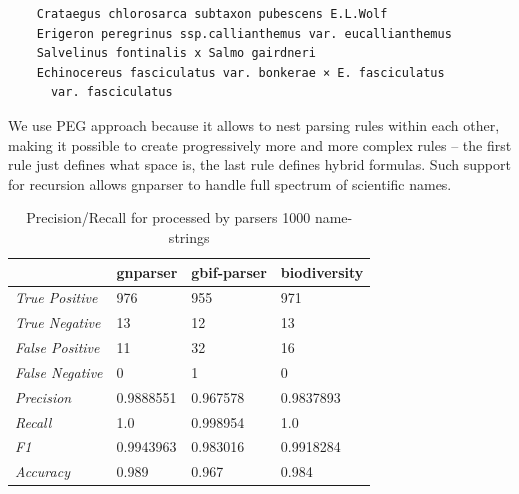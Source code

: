 \documentclass{bmcart}
\begin{document}
\vspace{0.5cm}
\begin{verbatim}
    Crataegus chlorosarca subtaxon pubescens E.L.Wolf
    Erigeron peregrinus ssp.callianthemus var. eucallianthemus
    Salvelinus fontinalis x Salmo gairdneri
    Echinocereus fasciculatus var. bonkerae × E. fasciculatus
      var. fasciculatus
\end{verbatim}
\vspace{0.5cm}

We use PEG approach because it allows to nest parsing rules within each other,
making it possible to create progressively more and more complex rules -- the
first rule just defines what space is, the last rule defines hybrid formulas.
Such support for recursion allows gnparser to handle full spectrum of
scientific names.

\begin{table}[htb]
  \begin{center}
    \caption{Precision/Recall for processed by parsers 1000
    name-strings}\label{table:precision}
    \resizebox{10cm}{!} {
    \begin{tabular}{|l|*{3}{l}|}
      \hline
                             & gnparser & gbif-parser & biodiversity \\
      \hline
      \textit{True Positive} & 976      & 955         & 971          \\
      \textit{True Negative} & 13       & 12          & 13           \\
      \textit{False Positive}& 11       & 32          & 16           \\
      \textit{False Negative}& 0        & 1           & 0            \\
      \textit{Precision}     & 0.9888551& 0.967578    & 0.9837893    \\
      \textit{Recall}        & 1.0      & 0.998954    & 1.0          \\
      \textit{F1}            & 0.9943963& 0.983016    & 0.9918284    \\
      \textit{Accuracy}      & 0.989    & 0.967       & 0.984        \\
      \hline
    \end{tabular}
    }
  \end{center}
\end{table}
\end{document}
